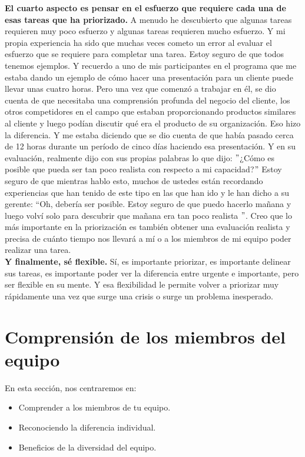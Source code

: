 \documentclass[10pt]{book}
\begin{document}
\textbf{El cuarto aspecto es pensar en el esfuerzo que requiere cada una de esas tareas que ha priorizado.} A menudo he descubierto que algunas tareas requieren muy poco esfuerzo y algunas tareas requieren mucho esfuerzo. Y mi propia experiencia ha sido que muchas veces cometo un error al evaluar el esfuerzo que se requiere para completar una tarea. Estoy seguro de que todos tenemos ejemplos. Y recuerdo a uno de mis participantes en el programa que me estaba dando un ejemplo de cómo hacer una presentación para un cliente puede llevar unas cuatro horas. Pero una vez que comenzó a trabajar en él, se dio cuenta de que necesitaba una comprensión profunda del negocio del cliente, los otros competidores en el campo que estaban proporcionando productos similares al cliente y luego podían discutir qué era el producto de su organización. Eso hizo la diferencia. Y me estaba diciendo que se dio cuenta de que había pasado cerca de 12 horas durante un período de cinco días haciendo esa presentación. Y en su evaluación, realmente dijo con sus propias palabras lo que dijo: $"$¿Cómo es posible que pueda ser tan poco realista con respecto a mi capacidad?$"$ Estoy seguro de que mientras hablo esto, muchos de ustedes están recordando experiencias que han tenido de este tipo en las que han ido y le han dicho a su gerente: $“$Oh, debería ser posible. Estoy seguro de que puedo hacerlo mañana y luego volví solo para descubrir que mañana era tan poco realista $"$. Creo que lo más importante en la priorización es también obtener una evaluación realista y precisa de cuánto tiempo nos llevará a mí o a los miembros de mi equipo poder realizar una tarea.\\
\textbf{Y finalmente, sé flexible.} Sí, es importante priorizar, es importante delinear sus tareas, es importante poder ver la diferencia entre urgente e importante, pero ser flexible en su mente. Y esa flexibilidad le permite volver a priorizar muy rápidamente una vez que surge una crisis o surge un problema inesperado.
\section{Comprensión de los miembros del equipo}
En esta sección, nos centraremos en:
\begin{itemize}
\item Comprender a los miembros de tu equipo.
\item Reconociendo la diferencia individual.
\item Beneficios de la diversidad del equipo.
\end{itemize}
\end{document}
